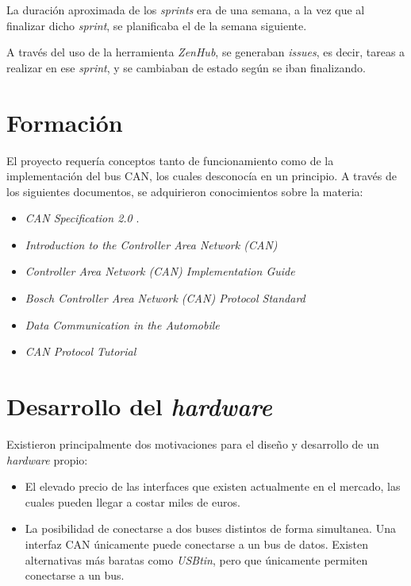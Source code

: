 La duración aproximada de los \emph{sprints} era de una semana, a la vez que al finalizar dicho \emph{sprint}, se planificaba el de la semana siguiente.

A través del uso de la herramienta \emph{ZenHub}, se generaban \emph{issues}, es decir, tareas a realizar en ese \emph{sprint}, y se cambiaban de estado según se iban finalizando.

\section{Formación}\label{formacion}

El proyecto requería conceptos tanto de funcionamiento como de la implementación del bus CAN, los cuales desconocía en un principio. A través de los siguientes documentos, se adquirieron conocimientos sobre la materia:

\begin{itemize}
\item
\emph{CAN Specification 2.0} \cite{bosch:can}.
\item
\emph{Introduction to the Controller Area Network (CAN)} \cite{texas:can}
\item
\emph{Controller Area Network (CAN) Implementation Guide}\cite{analog:can}
\item
\emph{Bosch Controller Area Network (CAN) Protocol Standard}\cite{nxp:can}
\item
\emph{Data Communication in the Automobile}\cite{vector:can}
\item
\emph{CAN Protocol Tutorial}\cite{kvaser:can}

\end{itemize}


\section{Desarrollo del \emph{hardware}}\label{desarrollo_del_hardware}

Existieron principalmente dos motivaciones para el diseño y desarrollo de un \emph{hardware} propio:

\begin{itemize}
\item
El elevado precio de las interfaces que existen actualmente en el mercado, las cuales pueden llegar a costar miles de euros.
\item
La posibilidad de conectarse a dos buses distintos de forma simultanea. Una interfaz CAN únicamente puede conectarse a un bus de datos. Existen alternativas más baratas como \emph{USBtin}\cite{usbtin}, pero que únicamente permiten conectarse a un bus.
\end{itemize}


